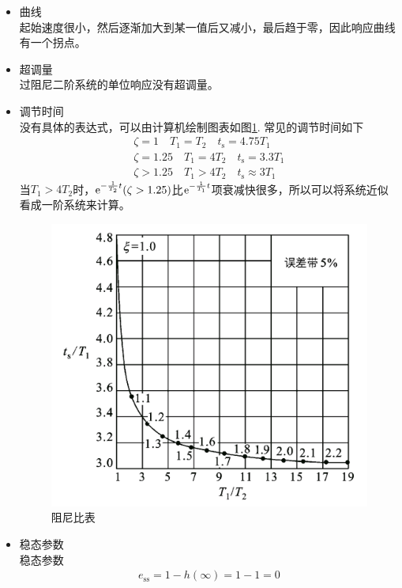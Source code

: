 \begin{itemize}
	\item 曲线\\
	\hspace*{2em} 起始速度很小，然后逐渐加大到某一值后又减小，最后趋于零，因此响应曲线有一个拐点。
	\item 超调量\\
	\hspace*{2em} 过阻尼二阶系统的单位响应没有超调量。
	\item 调节时间\\
	\hspace*{2em} 没有具体的表达式，可以由计算机绘制图表如图\ref{阻尼比表}.
	常见的调节时间如下
	\begin{align*}
		\zeta = 1 \quad T_1 = T_2 \quad t_\text{s} = 4.75T_1\\
		\zeta = 1.25 \quad T_1 = 4T_2 \quad t_\text{s} = 3.3T_1\\
		\zeta > 1.25 \quad T_1 > 4 T_2 \quad t_\text{s} \approx 3 T_1
	\end{align*}
	当$T_1 > 4T_2
	$时，${\rm{e}}^{-\frac{1}{T_2}t}(\zeta > 1.25)$比${\rm{e}}^{-\frac{1}{T_1}t}$项衰减快很多，所以可以将系统近似看成一阶系统来计算。
	\begin{figure}[!htb]
		\centering 
		\includegraphics[width=0.5\linewidth]{pic/阻尼比表.png}
		\vspace*{-1em}
		\caption{\quad 阻尼比表}
		\label{阻尼比表}
	\end{figure}
	\item 稳态参数\\
	\hspace*{2em} 稳态参数
	\begin{align*}
		e_{\text{ss}} = 1 - h(\infty) = 1 -1 =0
	\end{align*}
\end{itemize}
 
